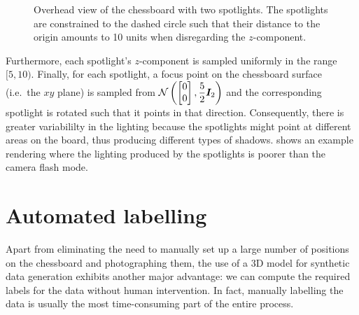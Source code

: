 \documentclass[../report.tex]{subfiles}
\begin{document}
\begin{enumerate}
\begin{figure}
            \caption[Overhead view of the chessboard with two spotlights.]{Overhead view of the chessboard with two spotlights. The spotlights are constrained to the dashed circle such that their distance to the origin amounts to 10 units when disregarding the $z$-component.}
            \label{fig:chessboard_lighting_circle}
        \end{figure}
        Furthermore, each spotlight's $z$-component is sampled uniformly in the range $[5, 10)$.
        Finally, for each spotlight, a focus point on the chessboard surface (i.e.\ the $xy$ plane) is sampled from
        \(
            \mathcal{N}\left(
                \begin{bmatrix}
                    0 \\ 0
                \end{bmatrix},
                \displaystyle \frac{5}{2} {\bm{I}}_2
            \right)
        \)
        and the corresponding spotlight is rotated such that it points in that direction.
        Consequently, there is greater variabililty in the lighting because the spotlights might point at different areas on the board, thus producing different types of shadows.
         shows an example rendering where the lighting produced by the spotlights is poorer than the camera flash mode.
\end{enumerate}

\section{Automated labelling}
\label{sec:automated_labelling}
Apart from eliminating the need to manually set up a large number of positions on the chessboard and photographing them, the use of a 3D model for synthetic data generation exhibits another major advantage: we can compute the required labels for the data without human intervention.
In fact, manually labelling the data is usually the most time-consuming part of the entire process.
\end{document}
